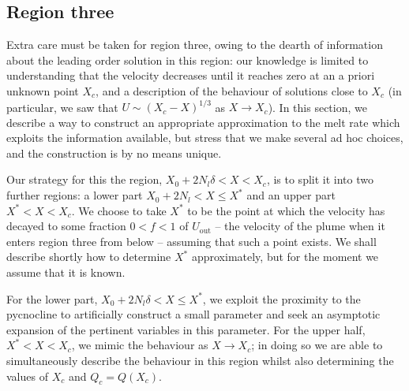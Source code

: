\documentclass[openacc]{rsproca_new}%
\newcommand{\lt}{\delta} %
\newcommand{\out}{\text{out}}
\begin{document}
\subsection{Region three}\label{S:MeltRate:R3}
Extra care must be taken for region three, owing to the dearth of information about the leading order solution in this region: our knowledge is limited to understanding that the velocity decreases until it reaches zero at an a priori unknown point $X_c$, and a description of the behaviour of solutions close to $X_c$ (in particular, we saw that $U \sim (X_c - X)^{1/3}$ as $X \to X_c$). In this section, we describe a way to construct an appropriate approximation to the melt rate which exploits the information available, but stress that we make several ad hoc choices, and the construction is by no means unique.

Our strategy for this the region, $X_0 + 2N_l \lt < X < X_c$, is to split it into two further regions: a lower part $X_0 + 2 N_l < X \leq X^*$ and an upper part $X^* < X < X_c$. We choose to take $X^*$ to be the point at which the velocity has decayed to some fraction $0 < f < 1$ of $U_\out$ -- the velocity of the plume when it enters region three from below -- assuming that such a point exists. We shall describe shortly how to determine $X^*$ approximately, but for the moment we assume that it is known.

For the lower part, $X_0  + 2N_l \lt < X \leq X^*$, we exploit the proximity to the pycnocline to artificially construct a small parameter and seek an asymptotic expansion of the pertinent variables in this parameter. For the upper half, $X^* < X < X_c$, we mimic the behaviour as $X \to X_c$; in doing so we are able to simultaneously describe the behaviour in this region whilst also determining the values of $X_c$ and $Q_c = Q(X_c)$.
\end{document}
